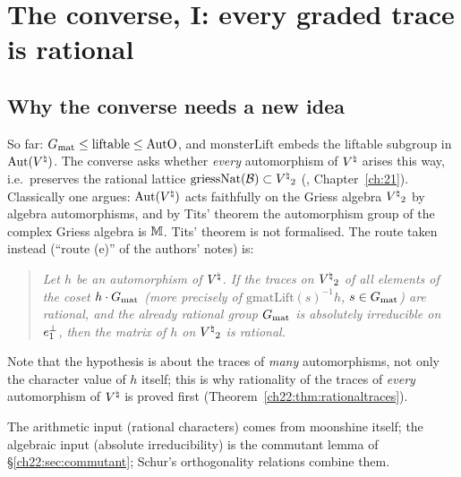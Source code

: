 \section{The converse, I: every graded trace is rational}\label{ch22:sec:traces}

\subsection{Why the converse needs a new idea}

So far: $G_{\mathrm{mat}}\le\mathrm{liftable}\le\mathrm{AutO}$, and $\mathrm{monsterLift}$ embeds the liftable subgroup
in $\operatorname{Aut}({V^{\natural}})$.  The converse asks whether \emph{every} automorphism of ${V^{\natural}}$ arises this way, i.e.\ preserves the
rational lattice $\mathrm{griessNat}(\mathcal{B})\subset{V^{\natural}}_2$ (,
Chapter~\ref{ch:21}).  Classically one argues: $\operatorname{Aut}({V^{\natural}})$ acts faithfully on the Griess algebra ${V^{\natural}}_2$ by algebra
automorphisms, and by Tits' theorem the automorphism group of the complex Griess algebra is $\mathbb{M}$.  Tits'
theorem is not formalised.  The route taken instead (``route (e)'' of the authors' notes) is:

\begin{quote}
\emph{Let $h$ be an automorphism of ${V^{\natural}}$.  If the traces on ${V^{\natural}}_2$ of all elements of the coset
$h\cdot G_{\mathrm{mat}}$ (more precisely of $\mathrm{gmatLift}(s)^{-1}h$, $s\in G_{\mathrm{mat}}$) are rational, and the already
rational group $G_{\mathrm{mat}}$ is absolutely irreducible on $\mathbf \mathbf{e}_1^\perp$, then the matrix of $h$ on ${V^{\natural}}_2$ is
rational.}
\end{quote}
Note that the hypothesis is about the traces of \emph{many} automorphisms, not only the character value of $h$ itself;
this is why rationality of the traces of \emph{every} automorphism of ${V^{\natural}}$ is proved first
(Theorem~\ref{ch22:thm:rationaltraces}).

The arithmetic input (rational characters) comes from moonshine itself; the algebraic input (absolute irreducibility) is
the commutant lemma of \S\ref{ch22:sec:commutant}; Schur's orthogonality relations combine them.

